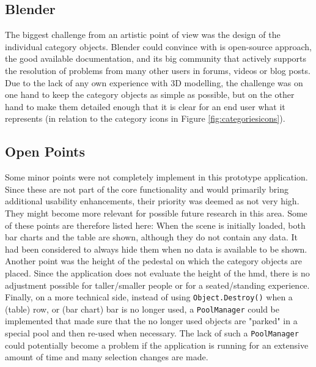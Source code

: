 \subsection{Blender}

The biggest challenge from an artistic point of view was the design of the individual category objects. Blender could convince with is open-source approach, the good available documentation, and its big community that actively supports the resolution of problems from many other users in forums, videos or blog posts. Due to the lack of any own experience with 3D modelling, the challenge was on one hand to keep the category objects as simple as possible, but on the other hand to make them detailed enough that it is clear for an end user what it represents (in relation to the category icons in Figure \ref{fig:categoriesicons}).


\subsection{Open Points}

Some minor points were not completely implement in this prototype application. Since these are not part of the core functionality and would primarily bring additional usability enhancements, their priority was deemed as not very high. They might become more relevant for possible future research in this area. Some of these points are therefore listed here: \newline
When the scene is initially loaded, both bar charts and the table are shown, although they do not contain any data. It had been considered to always hide them when no data is available to be shown. Another point was the height of the pedestal on which the category objects are placed. Since the application does not evaluate the height of the \gls{hmd}, there is no adjustment possible for taller/smaller people or for a seated/standing experience. Finally, on a more technical side, instead of using \texttt{Object.Destroy()} when a (table) row, or (bar chart) bar is no longer used, a \texttt{PoolManager} could be implemented that made sure that the no longer used objects are "parked" in a special pool and then re-used when necessary. The lack of such a \texttt{PoolManager} could potentially become a problem if the application is running for an extensive amount of time and many selection changes are made.



